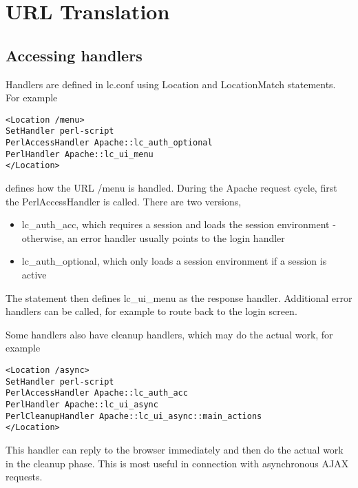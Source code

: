 \chapter{URL Translation}
\section{Accessing handlers}
Handlers are defined in lc.conf using Location and LocationMatch statements. For example
\begin{verbatim}
<Location /menu>
SetHandler perl-script
PerlAccessHandler Apache::lc_auth_optional
PerlHandler Apache::lc_ui_menu
</Location>
\end{verbatim}
defines how the URL /menu is handled. During the Apache request cycle, first the PerlAccessHandler is called. There are two versions,
\begin{itemize}
\item lc\_auth\_acc, which requires a session and loads the session environment - otherwise, an error handler usually points to the login handler
\item lc\_auth\_optional, which only loads a session environment if a session is active
\end{itemize}
The statement then defines lc\_ui\_menu as the response handler. Additional error handlers can be called, for example to route back to the login screen.

Some handlers also have cleanup handlers, which may do the actual work, for example
\begin{verbatim}
<Location /async>
SetHandler perl-script
PerlAccessHandler Apache::lc_auth_acc
PerlHandler Apache::lc_ui_async
PerlCleanupHandler Apache::lc_ui_async::main_actions
</Location>
\end{verbatim}
This handler can reply to the browser immediately and then do the actual work in the cleanup phase. This is most useful in connection with asynchronous AJAX requests.
